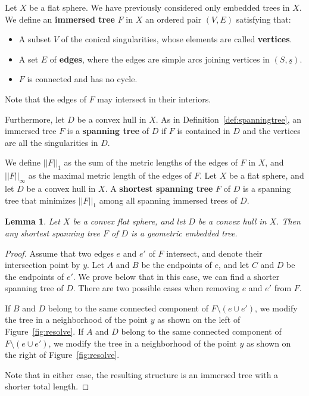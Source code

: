 \documentclass{compositio}
\numberwithin{equation}{section}
\numberwithin{figure}{section}
\theoremstyle{definition}
\theoremstyle{plain}
\newtheorem{lemma}[definition]{Lemma}
\begin{document}
{Let $X$ be a flat sphere. We have previously considered only embedded trees in $X$. We define an \textbf{immersed tree} $F$ in $X$ an ordered pair $(V,E)$ satisfying that:
\begin{itemize}
    \item A subset $V$ of the conical singularities, whose elements are called \textbf{vertices}.
    \item A set $E$ of \textbf{edges}, where the edges are simple arcs joining vertices in $(S, \underline{s})$.
    \item $F$ is connected and has no cycle.
\end{itemize}
Note that the edges of $F$ may intersect in their interiors.

Furthermore, let $D$ be a convex hull in $X$. As in Definition~\ref{def:spanningtree}, an immersed tree $F$ is a \textbf{spanning tree} of $D$ if $F$ is contained in $D$ and the vertices are all the singularities in $D$.

We define $||F||_1$ as the sum of the metric lengths of the edges of $F$ in $X$, and $||F||_{\infty}$ as the maximal metric length of the edges of $F$. Let $X$ be a flat sphere, and let $D$ be a convex hull in $X$. A \textbf{shortest spanning tree} $F$ of $D$ is a spanning tree that minimizes $||F||_1$ among all spanning immersed trees of $D$.

\begin{lemma}
    Let $X$ be a convex flat sphere, and let $D$ be a convex hull in $X$. Then any shortest spanning tree $F$ of $D$ is a geometric embedded tree.
\end{lemma}

\begin{proof}
    Assume that two edges $e$ and $e'$ of $F$ intersect, and denote their intersection point by $y$. Let $A$ and $B$ be the endpoints of $e$, and let $C$ and $D$ be the endpoints of $e'$. We prove below that in this case, we can find a shorter spanning tree of $D$. There are two possible cases when removing $e$ and $e'$ from $F$.  
    
    If $B$ and $D$ belong to the same connected component of $F \setminus (e \cup e')$, we modify the tree in a neighborhood of the point $y$ as shown on the left of Figure~\ref{fig:resolve}.  
    If $A$ and $D$ belong to the same connected component of $F \setminus (e \cup e')$, we modify the tree in a neighborhood of the point $y$ as shown on the right of Figure~\ref{fig:resolve}.  
    
    Note that in either case, the resulting structure is an immersed tree with a shorter total length.


\end{proof}}
\end{document}
